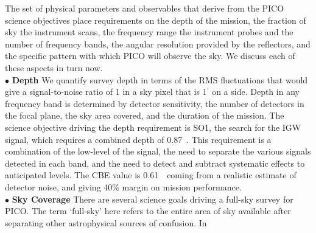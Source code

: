\documentclass[PICOReport.tex]{subfiles}
\begin{document}
The set of physical parameters and observables that derive from the PICO science objectives place 
requirements on the depth of the mission, the fraction of sky the instrument scans, the frequency range the 
instrument probes and the number of frequency bands, the angular resolution provided by the reflectors, and
the specific pattern with which PICO will observe the sky. We discuss each of these aspects in turn now. \\
%
$\bullet$ {\bf Depth} \hspace{0.1in} We quantify survey depth in terms of the RMS fluctuations that would give
a signal-to-noise ratio of 1 in a sky pixel that is 1$^\prime$ on a side. Depth in any frequency band 
is determined by detector sensitivity, the number of detectors in the focal plane, the sky area covered, and the 
duration of the mission.  The science objective driving 
the depth requirement is SO1, the search for the IGW signal, which 
requires a combined depth of 0.87~\microkamin. This requirement is a combination of the low-level of the signal, the need
to separate the various signals detected in each band, and the need to detect and subtract systematic effects 
to anticipated levels.  The \ac{CBE} value is 0.61~\microkamin\ coming from a realistic estimate of detector noise, and 
giving 40\% margin on mission performance. \\
%
$\bullet$ {\bf Sky Coverage} \hspace{0.1in} There are several science goals driving a full-sky survey for PICO. The 
term `full-sky' here refers to the entire area of sky available after separating other astrophysical sources of confusion. In 
\end{document}
